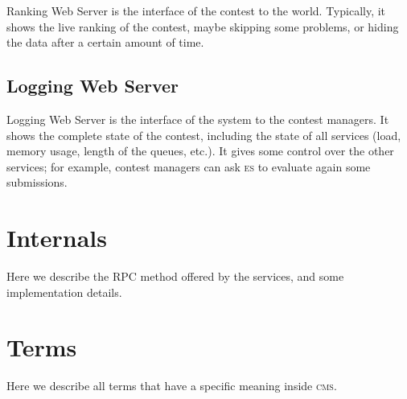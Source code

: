 \documentclass[a4paper,8pt]{amsart}
\newcommand{\CMS}{\textsc{cms}}
\newcommand{\ES}{\textsc{es}}
\begin{document}
\begin{multicols}{2}
  Ranking Web Server is the interface of the contest to the
  world. Typically, it shows the live ranking of the contest, maybe
  skipping some problems, or hiding the data after a certain amount of
  time.

  \subsection{Logging Web Server}

  Logging Web Server is the interface of the system to the contest
  managers. It shows the complete state of the contest, including the
  state of all services (load, memory usage, length of the queues,
  etc.). It gives some control over the other services; for example,
  contest managers can ask \ES{} to evaluate again some submissions.

  \section{Internals}

  Here we describe the RPC method offered by the services, and some
  implementation details.

  \section{Terms}

  Here we describe all terms that have a specific meaning inside \CMS{}.

\end{multicols}
\end{document}
